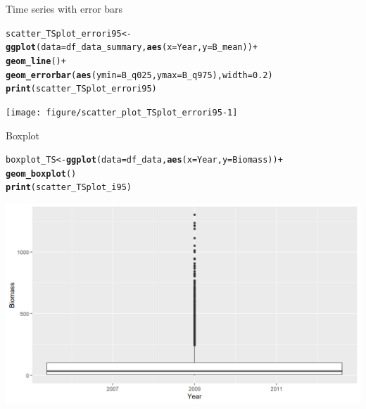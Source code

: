\documentclass{beamer}\usepackage[]{graphicx}\usepackage[]{color}
\makeatletter
\newcommand{\hlnum}[1]{\textcolor[rgb]{0.686,0.059,0.569}{#1}}%
\newcommand{\hlopt}[1]{\textcolor[rgb]{0,0,0}{#1}}%
\newcommand{\hlstd}[1]{\textcolor[rgb]{0.345,0.345,0.345}{#1}}%
\newcommand{\hlkwb}[1]{\textcolor[rgb]{0.69,0.353,0.396}{#1}}%
\newcommand{\hlkwc}[1]{\textcolor[rgb]{0.333,0.667,0.333}{#1}}%
\newcommand{\hlkwd}[1]{\textcolor[rgb]{0.737,0.353,0.396}{\textbf{#1}}}%
\newenvironment{kframe}{%
 \def\at@end@of@kframe{}%
 \ifinner\ifhmode%
  \def\at@end@of@kframe{\end{minipage}}%
  \begin{minipage}{\columnwidth}%
 \fi\fi%
 \def\FrameCommand##1{\hskip\@totalleftmargin \hskip-\fboxsep
 \colorbox{shadecolor}{##1}\hskip-\fboxsep
     \hskip-\linewidth \hskip-\@totalleftmargin \hskip\columnwidth}%
 \MakeFramed {\advance\hsize-\width
   \@totalleftmargin\z@ \linewidth\hsize
   \@setminipage}}%
 {\par\unskip\endMakeFramed%
 \at@end@of@kframe}
\newenvironment{knitrout}{}{} %
\makeatother
\begin{document}
\begin{frame}[fragile]{Time series with error bars}
\begin{knitrout}\footnotesize
{}\color{fgcolor}\begin{kframe}
\begin{alltt}
   \hlstd{scatter_TSplot_errori95} \hlkwb{<-} \hlkwd{ggplot}\hlstd{(}\hlkwc{data}\hlstd{=df_data_summary,} \hlkwd{aes}\hlstd{(}\hlkwc{x}\hlstd{=Year,} \hlkwc{y}\hlstd{=B_mean))} \hlopt{+}
               \hlkwd{geom_line}\hlstd{()} \hlopt{+}
               \hlkwd{geom_errorbar}\hlstd{(}\hlkwd{aes}\hlstd{(}\hlkwc{ymin} \hlstd{= B_q025,} \hlkwc{ymax} \hlstd{= B_q975),} \hlkwc{width} \hlstd{=} \hlnum{0.2}\hlstd{)}
   \hlkwd{print}\hlstd{(scatter_TSplot_errori95)}
\end{alltt}
\end{kframe}

{\centering \texttt{[image: figure/scatter\_plot\_TSplot\_errori95-1]} 

}



\end{knitrout}
\end{frame}

\begin{frame}[fragile]{Boxplot}
\begin{knitrout}\footnotesize
{}\color{fgcolor}\begin{kframe}
\begin{alltt}
    \hlstd{boxplot_TS} \hlkwb{<-} \hlkwd{ggplot}\hlstd{(}\hlkwc{data}\hlstd{=df_data,} \hlkwd{aes}\hlstd{(}\hlkwc{x}\hlstd{=Year,} \hlkwc{y}\hlstd{=Biomass))} \hlopt{+}
 \hlkwd{geom_boxplot}\hlstd{()}
    \hlkwd{print}\hlstd{(scatter_TSplot_i95)}
\end{alltt}
\end{kframe}

{\centering \includegraphics[width=.9\linewidth]{figure/boxplot_TS-1} 

}



\end{knitrout}
\end{frame}
\end{document}
